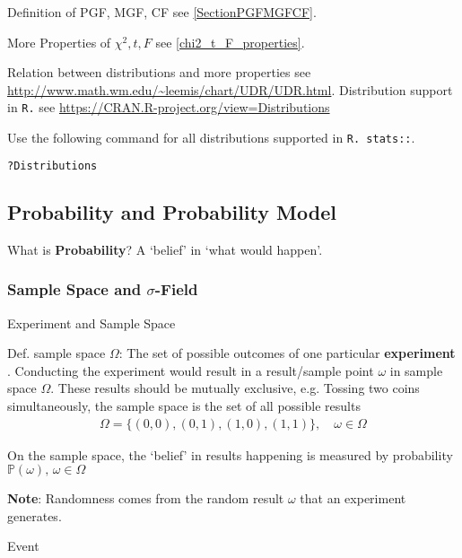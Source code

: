     Definition of PGF, MGF, CF see \autoref{SectionPGFMGFCF}.

    More Properties of $\chi^2,t,F$ see {\autoref{chi2_t_F_properties}}.

    Relation between distributions and more properties see \url{http://www.math.wm.edu/~leemis/chart/UDR/UDR.html}. Distribution support in \lstinline|R.| see \url{https://CRAN.R-project.org/view=Distributions}

Use the following command for all distributions supported in \lstinline|R. stats::|.
\begin{lstlisting}[language=R]
?Distributions
\end{lstlisting}


\subsection{Probability and Probability Model}

    What is \textbf{Probability}? A `belief' in `what would happen'.


\subsubsection{Sample Space and $\sigma$-Field}

\begin{point}
    Experiment and Sample Space
\end{point}

    Def. sample space $\Omega$: The set of  possible outcomes of one particular \textbf{experiment} . Conducting the experiment would result in a result/sample point $ \omega  $ in sample space $ \Omega  $. These results should be mutually exclusive, e.g. Tossing two coins simultaneously, the sample space is the set of all possible results
    \begin{align}
        \Omega = \{(0,0),(0,1),(1,0),(1,1)\}, \quad \omega \in \Omega 
    \end{align}

    On the sample space, the `belief' in results happening is measured by probability $ \mathbb{P}\left( \omega  \right),\,\omega \in\Omega   $

    \textbf{Note}: Randomness comes from the random result $ \omega  $ that an experiment generates.
    
\begin{point}
    Event 
\end{point}


